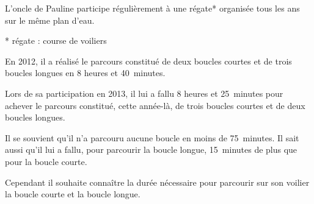 
\medskip 

L'oncle de Pauline participe régulièrement à une régate* organisée tous les ans sur le même plan d'eau. 

* régate : course de voiliers

\medskip 

En 2012, il a réalisé le parcours constitué de deux boucles courtes et de trois boucles longues en 8 heures et 40~minutes. 

Lors de sa participation en 2013, il lui a fallu 8 heures et 25~minutes pour achever le parcours constitué, cette année-là, de trois boucles courtes et de deux boucles longues. 

Il se souvient qu'il n'a parcouru aucune boucle en moins de 75~minutes. Il sait aussi qu'il lui a fallu, pour parcourir la boucle longue, 15~minutes de plus que pour la boucle courte. 

Cependant il souhaite connaître la durée nécessaire pour parcourir sur son voilier la boucle courte et la boucle longue.

\medskip 

